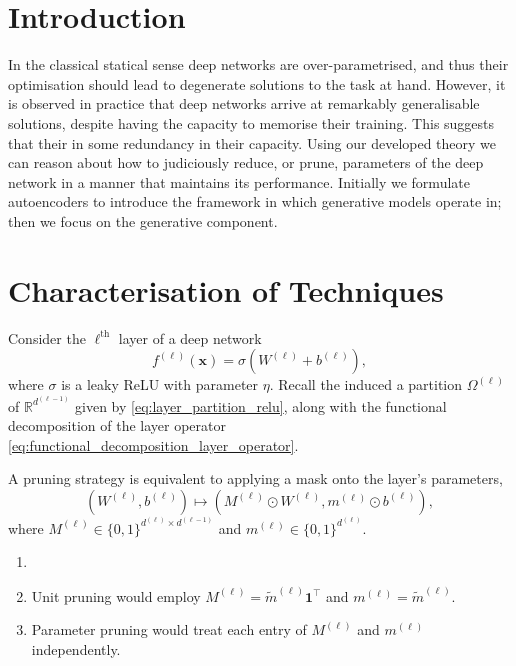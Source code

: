 \section{Introduction}

In the classical statical sense deep networks are over-parametrised, and thus their optimisation should lead to degenerate solutions to the task at hand. However, it is observed in practice that deep networks arrive at remarkably generalisable solutions, despite having the capacity to memorise their training. This suggests that their in some redundancy in their capacity. Using our developed theory we can reason about how to judiciously reduce, or prune, parameters of the deep network in a manner that maintains its performance. Initially we formulate autoencoders to introduce the framework in which generative models operate in; then we focus on the generative component.

\section{Characterisation of Techniques}

Consider the $\ell^\text{th}$ layer of a deep network $$f^{(\ell)}(\mathbf{x})=\sigma\left(W^{(\ell)}+b^{(\ell)}\right),$$where $\sigma$ is a leaky ReLU with parameter $\eta$. Recall the induced a partition $\Omega^{(\ell)}$ of $\mathbb{R}^{d^{(\ell-1)}}$ given by  \eqref{eq:layer_partition_relu}, along with the functional decomposition of the layer operator \eqref{eq:functional_decomposition_layer_operator}.

A pruning strategy is equivalent to applying a mask onto the layer's parameters, $$\left(W^{(\ell)},b^{(\ell)}\right)\mapsto\left(M^{(\ell)}\odot W^{(\ell)},m^{(\ell)}\odot b^{(\ell)}\right),$$where $M^{(\ell)}\in\{0,1\}^{d^{(\ell)}\times d^{(\ell-1)}}$ and $m^{(\ell)}\in\{0,1\}^{d^{(\ell)}}$.

\begin{example}
    \begin{enumerate}
        \item[]
        \item Unit pruning would employ $M^{(\ell)}=\tilde{m}^{(\ell)}\mathbf{1}^\top$ and $m^{(\ell)}=\tilde{m}^{(\ell)}$.
        \item Parameter pruning would treat each entry of $M^{(\ell)}$ and $m^{(\ell)}$ independently.
    \end{enumerate}
\end{example}

